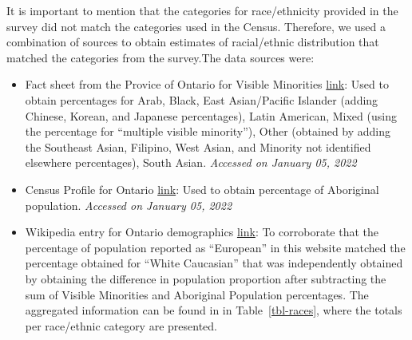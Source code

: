 \documentclass[
]{article}
\begin{document}
It is important to mention that the categories for race/ethnicity
provided in the survey did not match the categories used in the Census.
Therefore, we used a combination of sources to obtain estimates of
racial/ethnic distribution that matched the categories from the
survey.The data sources were:

\begin{itemize}
\item
  Fact sheet from the Provice of Ontario for Visible Minorities
  \href{https://www.ontario.ca/document/2016-census-highlights/fact-sheet-9-ethnic-origin-and-visible-minorities}{link}:
  Used to obtain percentages for Arab, Black, East Asian/Pacific
  Islander (adding Chinese, Korean, and Japanese percentages), Latin
  American, Mixed (using the percentage for ``multiple visible
  minority''), Other (obtained by adding the Southeast Asian, Filipino,
  West Asian, and Minority not identified elsewhere percentages), South
  Asian. \emph{Accessed on January 05, 2022}
\item
  Census Profile for Ontario
  \href{https://www12.statcan.gc.ca/census-recensement/2016/dp-pd/prof/details/page.cfm?Lang=E\&Geo1=PR\&Code1=35\&Geo2=PR\&Code2=01\&SearchText=Ontario\&SearchType=Begins\&SearchPR=01\&B1=Aboriginal\%20peoples\&TABID=1\&type=1}{link}:
  Used to obtain percentage of Aboriginal population. \emph{Accessed on
  January 05, 2022}
\item
  Wikipedia entry for Ontario demographics
  \href{https://en.wikipedia.org/wiki/Demographics_of_Ontario}{link}: To
  corroborate that the percentage of population reported as ``European''
  in this website matched the percentage obtained for ``White
  Caucasian'' that was independently obtained by obtaining the
  difference in population proportion after subtracting the sum of
  Visible Minorities and Aboriginal Population percentages. The
  aggregated information can be found in in Table~\ref{tbl-races}, where
  the totals per race/ethnic category are presented.
\end{itemize}
\end{document}
